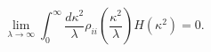 \begin{equation}
\lim_{\lambda \rightarrow \infty} \int_0 ^\infty \frac{d \kappa^2}{\lambda}
\rho_{ii} \left(\frac{\kappa^2}{\lambda}\right) H(\kappa^2) =0.
\label{lemma}
\end{equation}

